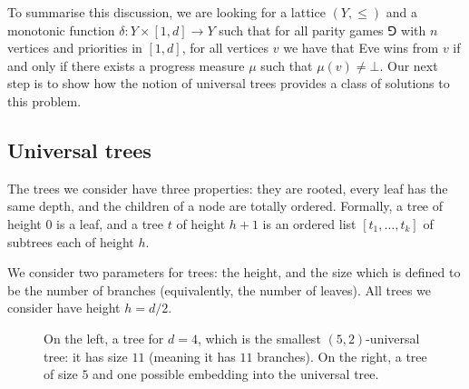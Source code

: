 To summarise this discussion, we are looking for a lattice $(Y,\le)$ and a monotonic function $\delta : Y \times [1,d] \to Y$ 
such that for all parity games $\Game$ with $n$ vertices and priorities in $[1,d]$, 
for all vertices $v$ we have that Eve wins from $v$ if and only if there exists a progress measure $\mu$ such that $\mu(v) \neq \bot$.
Our next step is to show how the notion of universal trees provides a class of solutions to this problem.

\subsection*{Universal trees}
The trees we consider have three properties: 
they are rooted, every leaf has the same depth, and the children of a node are totally ordered.
Formally, a tree of height $0$ is a leaf,
and a tree $t$ of height $h + 1$ is an ordered list $[t_1,\dots,t_k]$ of subtrees each of height $h$.

We consider two parameters for trees: the height, and the size which is defined to be the number of branches (equivalently, the number of leaves).
All trees we consider have height $h = d/2$.

\begin{figure*}[!ht]
\centering
{}
\caption{On the left, a tree for $d = 4$, which is the smallest $(5,2)$-universal tree:
it has size $11$ (meaning it has $11$ branches).
On the right, a tree of size $5$ and one possible embedding into the universal tree.}
\label{3-fig:example_universal}
\end{figure*}

